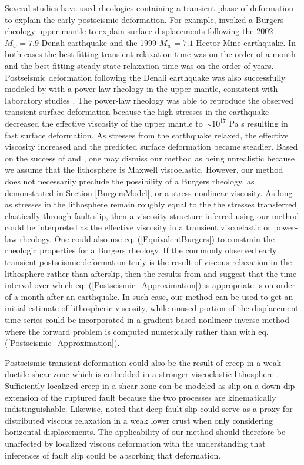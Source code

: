Several studies have used rheologies containing a transient phase of
deformation to explain the early postseismic deformation.  For
example, \citet{Pollitz2003,Pollitz2005} invoked a Burgers rheology upper mantle
to explain surface displacements following the 2002 $M_w=7.9$ Denali
earthquake and the 1999 $M_w=7.1$ Hector Mine earthquake.  In both
cases the best fitting transient relaxation time was on the order of a
month and the best fitting steady-state relaxation time was on the
order of years.  Postseismic deformation following the Denali
earthquake was also successfully modeled by \citet{Freed2006b} with a
power-law rheology in the upper mantle, consistent with laboratory
studies \citep[e.g.][]{Kirby1987}.  The power-law rheology was able to
reproduce the observed transient surface deformation because the high
stresses in the earthquake decreased the effective viscosity of the
upper mantle to $\sim10^{17}$ Pa s resulting in fast surface
deformation.  As stresses from the earthquake relaxed, the effective
viscosity increased and the predicted surface deformation became
steadier. Based on the success of \citet{Pollitz2003,Pollitz2005} and
\citet{Freed2006b}, one may dismiss our method as being unrealistic
because we assume that the lithosphere is Maxwell viscoelastic.
However, our method does not necessarily preclude the possibility of a
Burgers rheology, as demonstrated in Section \ref{BurgersModel}, or a
stress-nonlinear viscosity.  As long as stresses in the lithosphere
remain roughly equal to the the stresses transferred elastically
through fault slip, then a viscosity structure inferred using our
method could be interpreted as the effective viscosity in a transient
viscoelastic or power-law rheology.  One could also use
eq. (\ref{EquivalentBurgers}) to constrain the rheologic properties
for a Burgers rheology.  If the commonly observed early transient
postseismic deformation truly is the result of viscous relaxation in
the lithosphere rather than afterslip, then the results from
\citet{Pollitz2003,Pollitz2005} and \citet{Freed2006b} suggest that the time interval
over which eq. (\ref{Postseismic_Approximation}) is appropriate is on
order of a month after an earthquake.  In such case, our method can be
used to get an initial estimate of lithospheric viscosity, while
unused portion of the displacement time series could be incorporated
in a gradient based nonlinear inverse method where the forward problem
is computed numerically rather than with
eq. (\ref{Postseismic_Approximation}).

Postseismic transient deformation could also be the result of creep in
a weak ductile shear zone which is embedded in a stronger viscoelastic
lithosphere \citep[e.g.][]{Hetland2014}. Sufficiently localized creep in a
shear zone can be modeled as slip on a down-dip extension of the
ruptured fault \citep[e.g.][]{Hearn2002,Kenner2003,Johnson2004} because the two
processes are kinematically indistinguishable.  Likewise,
\citet{Freed2006b} noted that deep fault slip could serve as a proxy for
distributed viscous relaxation in a weak lower crust when only
considering horizontal displacements. The applicability of our method
should therefore be unaffected by localized viscous deformation with
the understanding that inferences of fault slip could be absorbing
that deformation.


